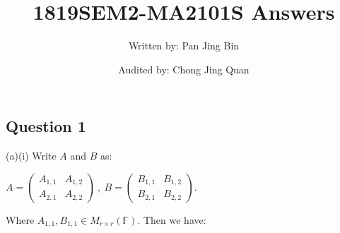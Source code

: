 \documentclass{article}
\title{1819SEM2-MA2101S Answers}
\author{Written by: Pan Jing Bin}
\date{Audited by: Chong Jing Quan}
\begin{document}
\maketitle

\subsection*{Question 1}(a)(i) Write $A$ and $B$ as: \begin{center}    $A = \begin{pmatrix}
A_{1,1} & A_{1,2}\\
A_{2,1} & A_{2,2}
\end{pmatrix}\ ,\ B = \begin{pmatrix}
B_{1,1} & B_{1,2}\\
B_{2,1} & B_{2,2}
\end{pmatrix}$.
\end{center}
Where $A_{1,1},B_{1,1} \in M_{r\times r}(\mathbb{F})$. Then we have:
\end{document}
